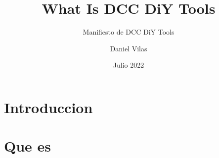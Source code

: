 \documentclass[spanish]{DccDiyTools/DccDiyTools}
\title{What Is DCC DiY Tools}
\subtitle{Manifiesto de DCC DiY Tools}
\author{Daniel Vilas}
\date{Julio 2022}
\begin{document}
\maketitle
\newpage
\section{Introduccion}


\newpage
\section{Que es}

\end{document}

